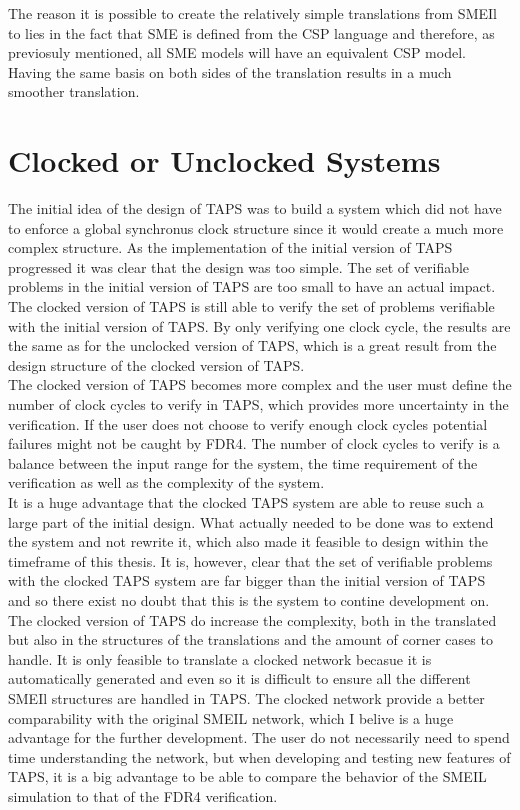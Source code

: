 The reason it is possible to create the relatively simple translations from SMEIl to \cspm{} lies in the fact that SME is defined from the CSP language and therefore, as previosuly mentioned, all SME models will have an equivalent CSP model. Having the same basis on both sides of the translation results in a much smoother translation.

\section{Clocked or Unclocked \cspm{} Systems}
The initial idea of the design of TAPS was to build a system which did not have to enforce a global synchronus clock structure since it would create a much more complex structure. As the implementation of the initial version of TAPS progressed it was clear that the design was too simple. The set of verifiable problems in the initial version of TAPS are too small to have an actual impact.\\

The clocked version of TAPS is still able to verify the set of problems verifiable with the initial version of TAPS. By only verifying one clock cycle, the results are the same as for the unclocked version of TAPS, which is a great result from the design structure of the clocked version of TAPS. \\

The clocked version of TAPS becomes more complex and the user must define the number of clock cycles to verify in TAPS, which provides more uncertainty in the verification. If the user does not choose to verify enough clock cycles potential failures might not be caught by FDR4. The number of clock cycles to verify is a balance between the input range for the system, the time requirement of the verification as well as the complexity of the system. \\

It is a huge advantage that the clocked TAPS system are able to reuse such a large part of the initial design. What actually needed to be done was to extend the system and not rewrite it, which also made it feasible to design within the timeframe of this thesis. It is, however, clear that the set of verifiable problems with the clocked TAPS system are far bigger than the initial version of TAPS and so there exist no doubt that this is the system to contine development on. The clocked version of TAPS do increase the complexity, both in the translated \cspm{} but also in the structures of the translations and the amount of corner cases to handle. It is only feasible to translate a clocked network becasue it is automatically generated and even so it is difficult to ensure all the different SMEIl structures are handled in TAPS.
The clocked \cspm{} network provide a better comparability with the original SMEIL network, which I belive is a huge advantage for the further development. The user do not necessarily need to spend time understanding the \cspm{} network, but when developing and testing new features of TAPS, it is a big advantage to be able to compare the behavior of the SMEIL simulation to that of the FDR4 verification. \\

